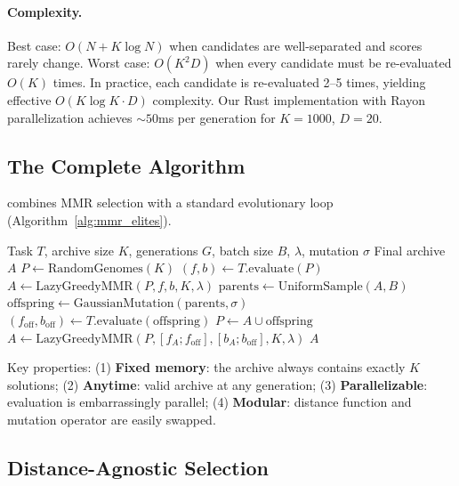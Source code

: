 \paragraph{Complexity.}
Best case: $O(N + K \log N)$ when candidates are well-separated and scores rarely change.
Worst case: $O(K^2 D)$ when every candidate must be re-evaluated $O(K)$ times.
In practice, each candidate is re-evaluated 2--5 times, yielding effective $O(K \log K \cdot D)$ complexity.
Our Rust implementation with Rayon parallelization achieves ${\sim}50$ms per generation for $K = 1000$, $D = 20$.

\subsection{The Complete Algorithm}
\label{sec:full_algorithm}

\mmr combines MMR selection with a standard evolutionary loop (Algorithm~\ref{alg:mmr_elites}).

\begin{algorithm}[t]
\caption{\mmr Evolution}
\label{alg:mmr_elites}
\begin{algorithmic}[1]
\REQUIRE Task $T$, archive size $K$, generations $G$, batch size $B$, $\lambda$, mutation $\sigma$
\ENSURE Final archive $A$
\STATE $P \gets \text{RandomGenomes}(K)$
\STATE $(f, b) \gets T.\text{evaluate}(P)$
\STATE $A \gets \text{LazyGreedyMMR}(P, f, b, K, \lambda)$
    \STATE $\text{parents} \gets \text{UniformSample}(A, B)$
    \STATE $\text{offspring} \gets \text{GaussianMutation}(\text{parents}, \sigma)$
    \STATE $(f_{\text{off}}, b_{\text{off}}) \gets T.\text{evaluate}(\text{offspring})$
    \STATE $P \gets A \cup \text{offspring}$
    \STATE $A \gets \text{LazyGreedyMMR}(P, [f_A; f_{\text{off}}], [b_A; b_{\text{off}}], K, \lambda)$
\ENDFOR
\RETURN $A$
\end{algorithmic}
\end{algorithm}

Key properties: (1) \textbf{Fixed memory}: the archive always contains exactly $K$ solutions; (2) \textbf{Anytime}: valid archive at any generation; (3) \textbf{Parallelizable}: evaluation is embarrassingly parallel; (4) \textbf{Modular}: distance function and mutation operator are easily swapped.

\subsection{Distance-Agnostic Selection}
\label{sec:distance}

